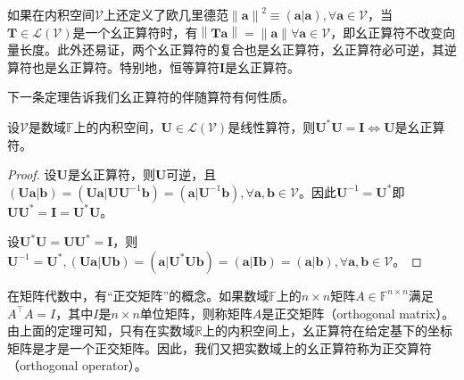 \documentclass[main.tex]{subfiles}
\begin{document}
如果在内积空间$\mathcal{V}$上还定义了欧几里德范$\left\|\mathbf{a}\right\|^2\equiv\left(\mathbf{a}|\mathbf{a}\right),\forall\mathbf{a}\in\mathcal{V}$，当$\mathbf{T}\in\mathcal{L}\left(\mathcal{V}\right)$是一个幺正算符时，有$\left\|\mathbf{Ta}\right\|=\left\|\mathbf{a}\right\|\forall\mathbf{a}\in\mathcal{V}$，即幺正算符不改变向量长度。此外还易证，两个幺正算符的复合也是幺正算符，幺正算符必可逆，其逆算符也是幺正算符。特别地，恒等算符$\mathbf{I}$是幺正算符。

下一条定理告诉我们幺正算符的伴随算符有何性质。

\begin{theorem}\label{thm:II.6.4}
设$\mathcal{V}$是数域$\mathbb{F}$上的内积空间，$\mathbf{U}\in\mathcal{L}\left(\mathcal{V}\right)$是线性算符，则$\mathbf{U}^*\mathbf{U}=\mathbf{I}\Leftrightarrow\mathbf{U}$是幺正算符。
\end{theorem}
\begin{proof}
设$\mathbf{U}$是幺正算符，则$\mathbf{U}$可逆，且$\left(\mathbf{Ua}|\mathbf{b}\right)=\left(\mathbf{Ua}|\mathbf{UU}^{-1}\mathbf{b}\right)=\left(\mathbf{a}|\mathbf{U}^{-1}\mathbf{b}\right),\forall\mathbf{a},\mathbf{b}\in\mathcal{V}$。因此$\mathbf{U}^{-1}=\mathbf{U}^*$即$\mathbf{UU}^*=\mathbf{I}=\mathbf{U}^*\mathbf{U}$。

设$\mathbf{U}^*\mathbf{U}=\mathbf{UU}^*=\mathbf{I}$，则$\mathbf{U}^{-1}=\mathbf{U}^*,\left(\mathbf{Ua}|\mathbf{Ub}\right)=\left(\mathbf{a}|\mathbf{U}^*\mathbf{Ub}\right)=\left(\mathbf{a}|\mathbf{Ib}\right)=\left(\mathbf{a}|\mathbf{b}\right),\forall\mathbf{a},\mathbf{b}\in\mathcal{V}$。
\end{proof}

在矩阵代数中，有“正交矩阵”的概念。如果数域$\mathbb{F}$上的$n\times n$矩阵$A\in\mathbb{F}^{n\times n}$满足$A^\intercal A=I$，其中$I$是$n\times n$单位矩阵，则称矩阵$A$是正交矩阵（orthogonal matrix）。由上面的定理可知，只有在实数域$\mathbb{R}$上的内积空间上，幺正算符在给定基下的坐标矩阵是才是一个正交矩阵。因此，我们又把实数域上的幺正算符称为正交算符（orthogonal operator）。
\end{document}
